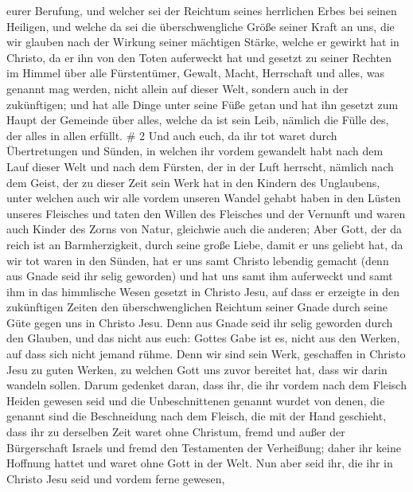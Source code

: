 eurer Berufung, und welcher sei der Reichtum seines herrlichen Erbes bei
seinen Heiligen,  und welche da sei die überschwengliche
Größe seiner Kraft an uns, die wir glauben nach der Wirkung seiner
mächtigen Stärke,  welche er gewirkt hat in Christo, da er
ihn von den Toten auferweckt hat und gesetzt zu seiner Rechten im Himmel
 über alle Fürstentümer, Gewalt, Macht, Herrschaft und
alles, was genannt mag werden, nicht allein auf dieser Welt, sondern
auch in der zukünftigen;  und hat alle Dinge unter seine
Füße getan und hat ihn gesetzt zum Haupt der Gemeinde über alles,
 welche da ist sein Leib, nämlich die Fülle des, der alles
in allen erfüllt. \# 2  Und auch euch, da ihr tot waret
durch Übertretungen und Sünden,  in welchen ihr vordem
gewandelt habt nach dem Lauf dieser Welt und nach dem Fürsten, der in
der Luft herrscht, nämlich nach dem Geist, der zu dieser Zeit sein Werk
hat in den Kindern des Unglaubens,  unter welchen auch wir
alle vordem unseren Wandel gehabt haben in den Lüsten unseres Fleisches
und taten den Willen des Fleisches und der Vernunft und waren auch
Kinder des Zorns von Natur, gleichwie auch die anderen; 
Aber Gott, der da reich ist an Barmherzigkeit, durch seine große Liebe,
damit er uns geliebt hat,  da wir tot waren in den Sünden,
hat er uns samt Christo lebendig gemacht (denn aus Gnade seid ihr selig
geworden)  und hat uns samt ihm auferweckt und samt ihm in
das himmlische Wesen gesetzt in Christo Jesu,  auf dass er
erzeigte in den zukünftigen Zeiten den überschwenglichen Reichtum seiner
Gnade durch seine Güte gegen uns in Christo Jesu.  Denn aus
Gnade seid ihr selig geworden durch den Glauben, und das nicht aus euch:
Gottes Gabe ist es,  nicht aus den Werken, auf dass sich
nicht jemand rühme.  Denn wir sind sein Werk, geschaffen in
Christo Jesu zu guten Werken, zu welchen Gott uns zuvor bereitet hat,
dass wir darin wandeln sollen.  Darum gedenket daran, dass
ihr, die ihr vordem nach dem Fleisch Heiden gewesen seid und die
Unbeschnittenen genannt wurdet von denen, die genannt sind die
Beschneidung nach dem Fleisch, die mit der Hand geschieht, 
dass ihr zu derselben Zeit waret ohne Christum, fremd und außer der
Bürgerschaft Israels und fremd den Testamenten der Verheißung; daher ihr
keine Hoffnung hattet und waret ohne Gott in der Welt.  Nun
aber seid ihr, die ihr in Christo Jesu seid und vordem ferne gewesen,

